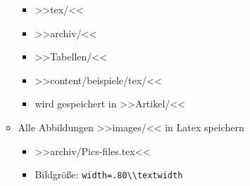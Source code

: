 \begin{enumerate}
\begin{itemize}
    \begin{itemize}
    \item
      >>tex/<<
    \item
      >>archiv/<<
    \item
      >>Tabellen/<<
    \item
      >>content/beispiele/tex/<<
    \item
      wird gespeichert in >>Artikel/<<
    \end{itemize}
  \item
    Alle Abbildungen >>images/<< in Latex speichern

    \begin{itemize}
    \item
      >>archiv/Pics-files.tex<<
    \item
      Bildgröße: \verb|width=.80\\textwidth|
    \end{itemize}
  \end{itemize}
\end{enumerate}

